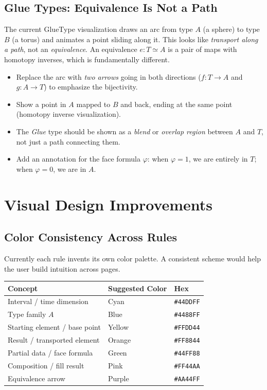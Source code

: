 \documentclass[11pt, a4paper]{article}
\begin{document}
\subsection{Glue Types: Equivalence Is Not a Path}

The current GlueType visualization draws an arc from type $A$ (a sphere) to type
$B$ (a torus) and animates a point sliding along it. This looks like \emph{transport
along a path}, not an \emph{equivalence}. An equivalence $e : T \simeq A$ is a pair
of maps with homotopy inverses, which is fundamentally different.

\begin{itemize}
  \item Replace the arc with \emph{two arrows} going in both directions ($f : T \to
    A$ and $g : A \to T$) to emphasize the bijectivity.
  \item Show a point in $A$ mapped to $B$ and back, ending at the same point
    (homotopy inverse visualization).
  \item The \emph{Glue} type should be shown as a \emph{blend} or \emph{overlap
    region} between $A$ and $T$, not just a path connecting them.
  \item Add an annotation for the face formula $\varphi$: when $\varphi = 1$,
    we are entirely in $T$; when $\varphi = 0$, we are in $A$.
\end{itemize}

\section{Visual Design Improvements}

\subsection{Color Consistency Across Rules}

Currently each rule invents its own color palette. A consistent scheme would help
the user build intuition across pages.

\begin{center}
\begin{tabular}{lll}
\toprule
\textbf{Concept} & \textbf{Suggested Color} & \textbf{Hex} \\
\midrule
Interval / time dimension & Cyan & \texttt{\#44DDFF} \\
Type family $A$ & Blue & \texttt{\#4488FF} \\
Starting element / base point & Yellow & \texttt{\#FFDD44} \\
Result / transported element & Orange & \texttt{\#FF8844} \\
Partial data / face formula & Green & \texttt{\#44FF88} \\
Composition / fill result & Pink & \texttt{\#FF44AA} \\
Equivalence arrow & Purple & \texttt{\#AA44FF} \\
\bottomrule
\end{tabular}
\end{center}
\end{document}

